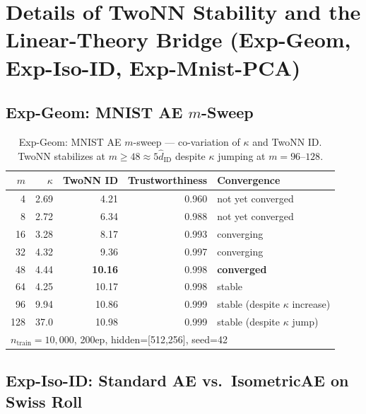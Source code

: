 \documentclass[make,article,submit,pdftex,moreauthors]{Definitions/mdpi}
\newcommand{\kap}{\kappa}
\begin{document}
\section[\appendixname~\thesection]{Details of TwoNN Stability and the Linear-Theory Bridge (Exp-Geom, Exp-Iso-ID, Exp-Mnist-PCA)}\label{app:twonn_detail}

\subsection*{Exp-Geom: MNIST AE $m$-Sweep}

\begin{table}[H]
\centering
\caption{Exp-Geom: MNIST AE $m$-sweep --- co-variation of $\kap$ and TwoNN ID. TwoNN stabilizes at $m \geq 48 \approx 5\hat{d}_\mathrm{ID}$ despite $\kap$ jumping at $m=96$--$128$.}
\label{tab:eq_mnist}
\small
\begin{tabular}{rrrrl}
\toprule
$m$ & $\kap$ & TwoNN ID & Trustworthiness & Convergence \\
\midrule
 4  & 2.69 & 4.21 & 0.960 & not yet converged \\
 8  & 2.72 & 6.34 & 0.988 & not yet converged \\
16  & 3.28 & 8.17 & 0.993 & converging \\
32  & 4.32 & 9.36 & 0.997 & converging \\
48  & 4.44 & \textbf{10.16} & 0.998 & \textbf{converged} \\
64  & 4.25 & 10.17 & 0.998 & stable \\
96  & 9.94 & 10.86 & 0.999 & stable (despite $\kap$ increase) \\
128 & 37.0 & 10.98 & 0.999 & stable (despite $\kap$ jump) \\
\midrule
\multicolumn{5}{l}{$n_\mathrm{train}=10{,}000$, 200ep, hidden=[512,256], seed=42} \\
\bottomrule
\end{tabular}
\end{table}

\subsection*{Exp-Iso-ID: Standard AE vs.\ IsometricAE on Swiss Roll}
\end{document}
